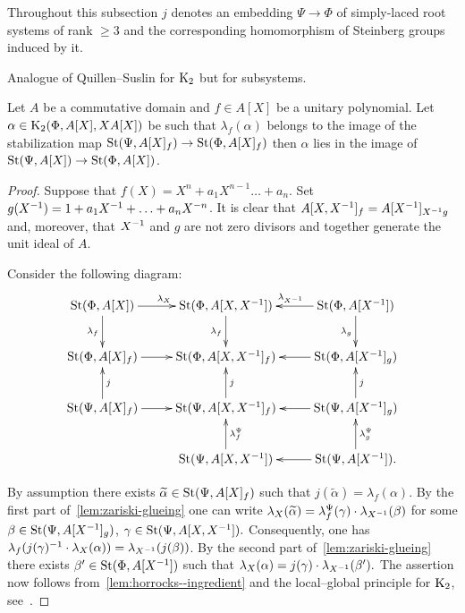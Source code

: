Throughout this subsection $j$ denotes an embedding $\Psi \to \Phi$ of simply-laced root systems of rank $\geq 3$ and the corresponding
 homomorphism of Steinberg groups induced by it.


\begin{lemma} \label{lem:qs-b}
  Analogue of Quillen--Suslin for $\operatorname{K}_2$ but for subsystems.
\end{lemma}

\begin{lemma} \label{lem:horrocks-b}
 Let $A$ be a commutative domain and $f \in A[X]$ be a unitary polynomial.
 Let $\alpha \in \operatorname{K}_2(\Phi, A[X], XA[X])$ be such that $\lambda_f(\alpha)$ belongs to the image of the stabilization map
 $\operatorname{St}(\Psi, A[X]_f) \to \operatorname{St}(\Phi, A[X]_f)$ then $\alpha$ lies in the image of $\operatorname{St}(\Psi, A[X]) \to \operatorname{St}(\Phi, A[X])$.
\end{lemma}
\begin{proof}
    Suppose that $f(X) = X^n + a_1 X^{n-1} \ldots + a_n$.
    Set $g(X^{-1}) = 1 + a_1 X^{-1} + \ldots + a_{n} X^{-n}$.
    It is clear that $A[X, X^{-1}]_f = A[X^{-1}]_{X^{-1} g}$ and, moreover, that $X^{-1}$ and $g$ are not zero divisors and together generate the unit ideal of $A$.

    Consider the following diagram:
    \[ \xymatrix{\St(\Phi, A[X]) \ar[r]^{\lambda_X} \ar[d]_{\lambda_f} & \St(\Phi, A[X, X\inv]) \ar[d]_{\lambda_f}  & \St(\Phi, A[X\inv]) \ar[l]_{\lambda_{X\inv}} \ar[d]_{\lambda_g}  \\
                 \St(\Phi, A[X]_f) \ar[r] & \St(\Phi, A[X, X\inv]_f) & \St(\Phi, A[X\inv]_g) \ar[l] \\
                 \St(\Psi, A[X]_f) \ar[r] \ar[u]_j & \St(\Psi, A[X, X\inv]_f) \ar[u]_j & \St(\Psi, A[X\inv]_g) \ar[l] \ar[u]_j \\
                                   & \St(\Psi, A[X, X\inv]) \ar[u]_{\lambda_f^\Psi}   & \St(\Psi, A[X\inv]). \ar[l] \ar[u]_{\lambda_g^\Psi}}\]

    By assumption there exists $\widetilde{\alpha} \in \operatorname{St}(\Psi, A[X]_f)$ such that $j(\widetilde{\alpha}) = \lambda_f(\alpha)$.
    By the first part of~\cref{lem:zariski-glueing} one can write $\lambda_X(\widetilde{\alpha}) = \lambda_f^\Psi(\gamma) \cdot \lambda_{X^{-1}}(\beta)$
     for some $\beta \in \operatorname{St}(\Psi, A[X^{-1}]_g)$, $\gamma \in \operatorname{St}(\Psi, A[X, X^{-1}]).$
    Consequently, one has $\lambda_f(j(\gamma)^{-1} \cdot \lambda_X(\alpha)) = \lambda_{X^{-1}}(j(\beta))$.
    By the second part of~\cref{lem:zariski-glueing} there exists $\beta' \in \operatorname{St}(\Phi, A[X^{-1}])$ such that $\lambda_X(\alpha) = j(\gamma) \cdot \lambda_{X^{-1}}(\beta').$
    The assertion now follows from~\cref{lem:horrocks--ingredient} and the local--global principle for $\operatorname{K}_2$, see~\cite{LS17}. %
\end{proof}

